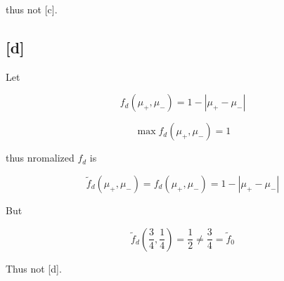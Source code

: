 \documentclass[fleqn,a4paper,12pt]{article}
\begin{document}
thus not [c].

\subsection*{[d]}

Let 

\begin{equation*}
  f_d(\mu_+, \mu_-) = 1 - |\mu_+ - \mu_-|
\end{equation*}

\begin{equation*}
  \max f_d(\mu_+, \mu_-) = 1
\end{equation*}

thus nromalized $f_d$ is 

\begin{equation*}
  \tilde{f}_d(\mu_+, \mu_-) = f_d(\mu_+, \mu_-) = 1 - |\mu_+ - \mu_-|
\end{equation*}

But 

\begin{equation*}
  \tilde{f}_d(\frac{3}{4}, \frac{1}{4}) = \frac{1}{2} \ne \frac{3}{4} = \tilde{f}_0
\end{equation*}

Thus not [d].
\end{document}
